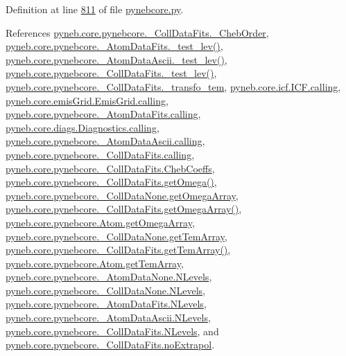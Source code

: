 Definition at line \hyperlink{pynebcore_8py_source_l00811}{811} of file \hyperlink{pynebcore_8py_source}{pynebcore.\+py}.



References \hyperlink{pynebcore_8py_source_l00656}{pyneb.\+core.\+pynebcore.\+\_\+\+Coll\+Data\+Fits.\+\_\+\+Cheb\+Order}, \hyperlink{pynebcore_8py_source_l00171}{pyneb.\+core.\+pynebcore.\+\_\+\+Atom\+Data\+Fits.\+\_\+test\+\_\+lev()}, \hyperlink{pynebcore_8py_source_l00435}{pyneb.\+core.\+pynebcore.\+\_\+\+Atom\+Data\+Ascii.\+\_\+test\+\_\+lev()}, \hyperlink{pynebcore_8py_source_l00660}{pyneb.\+core.\+pynebcore.\+\_\+\+Coll\+Data\+Fits.\+\_\+test\+\_\+lev()}, \hyperlink{pynebcore_8py_source_l00589}{pyneb.\+core.\+pynebcore.\+\_\+\+Coll\+Data\+Fits.\+\_\+transfo\+\_\+tem}, \hyperlink{icf_8py_source_l00016}{pyneb.\+core.\+icf.\+I\+C\+F.\+calling}, \hyperlink{emis_grid_8py_source_l00041}{pyneb.\+core.\+emis\+Grid.\+Emis\+Grid.\+calling}, \hyperlink{pynebcore_8py_source_l00090}{pyneb.\+core.\+pynebcore.\+\_\+\+Atom\+Data\+Fits.\+calling}, \hyperlink{diags_8py_source_l00169}{pyneb.\+core.\+diags.\+Diagnostics.\+calling}, \hyperlink{pynebcore_8py_source_l00311}{pyneb.\+core.\+pynebcore.\+\_\+\+Atom\+Data\+Ascii.\+calling}, \hyperlink{pynebcore_8py_source_l00568}{pyneb.\+core.\+pynebcore.\+\_\+\+Coll\+Data\+Fits.\+calling}, \hyperlink{pynebcore_8py_source_l00657}{pyneb.\+core.\+pynebcore.\+\_\+\+Coll\+Data\+Fits.\+Cheb\+Coeffs}, \hyperlink{pynebcore_8py_source_l00811}{pyneb.\+core.\+pynebcore.\+\_\+\+Coll\+Data\+Fits.\+get\+Omega()}, \hyperlink{pynebcore_8py_source_l00067}{pyneb.\+core.\+pynebcore.\+\_\+\+Coll\+Data\+None.\+get\+Omega\+Array}, \hyperlink{pynebcore_8py_source_l00783}{pyneb.\+core.\+pynebcore.\+\_\+\+Coll\+Data\+Fits.\+get\+Omega\+Array()}, \hyperlink{pynebcore_8py_source_l01247}{pyneb.\+core.\+pynebcore.\+Atom.\+get\+Omega\+Array}, \hyperlink{pynebcore_8py_source_l00068}{pyneb.\+core.\+pynebcore.\+\_\+\+Coll\+Data\+None.\+get\+Tem\+Array}, \hyperlink{pynebcore_8py_source_l00880}{pyneb.\+core.\+pynebcore.\+\_\+\+Coll\+Data\+Fits.\+get\+Tem\+Array()}, \hyperlink{pynebcore_8py_source_l01248}{pyneb.\+core.\+pynebcore.\+Atom.\+get\+Tem\+Array}, \hyperlink{pynebcore_8py_source_l00062}{pyneb.\+core.\+pynebcore.\+\_\+\+Atom\+Data\+None.\+N\+Levels}, \hyperlink{pynebcore_8py_source_l00075}{pyneb.\+core.\+pynebcore.\+\_\+\+Coll\+Data\+None.\+N\+Levels}, \hyperlink{pynebcore_8py_source_l00155}{pyneb.\+core.\+pynebcore.\+\_\+\+Atom\+Data\+Fits.\+N\+Levels}, \hyperlink{pynebcore_8py_source_l00404}{pyneb.\+core.\+pynebcore.\+\_\+\+Atom\+Data\+Ascii.\+N\+Levels}, \hyperlink{pynebcore_8py_source_l00637}{pyneb.\+core.\+pynebcore.\+\_\+\+Coll\+Data\+Fits.\+N\+Levels}, and \hyperlink{pynebcore_8py_source_l00567}{pyneb.\+core.\+pynebcore.\+\_\+\+Coll\+Data\+Fits.\+no\+Extrapol}.



